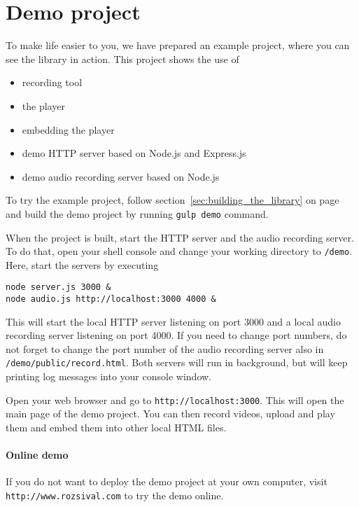 \section{Demo project}
\label{sec:demo}

To make life easier to you, we have prepared an example project, where you can see the library in action. This project shows the use of
\begin{itemize}
	\item recording tool
	\item the player
	\item embedding the player
	\item demo HTTP server based on Node.js and Express.js
	\item demo audio recording server based on Node.js
\end{itemize}

To try the example project, follow section~\ref{sec:building_the_library} on page~\pageref{sec:building_the_library} and build the demo project by running \verb|gulp demo| command.

When the project is built, start the HTTP server and the audio recording server. To do that, open your shell console and change your working directory to \verb|/demo|. Here, start the servers by executing

\begin{lstlisting}
node server.js 3000 &
node audio.js http://localhost:3000 4000 &
\end{lstlisting}

This will start the local HTTP server listening on port 3000 and a local audio recording server listening on port 4000. If you need to change port numbers, do not forget to change the port number of the audio recording server also in \verb|/demo/public/record.html|. Both servers will run in background, but will keep printing log messages into your console window.

Open your web browser and go to \verb|http://localhost:3000|. This will open the main page of the demo project. You can then record videos, upload and play them and embed them into other local HTML files.

\paragraph{Online demo}
If you do not want to deploy the demo project at your own computer, visit \verb|http://www.rozsival.com| to try the demo online.